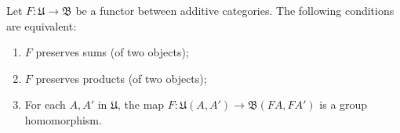 Let $F: \mathfrak{U} \to \mathfrak{B}$ be a functor between additive categories. The following conditions are equivalent:
\begin{enumerate}
\item[(i)] $F$ preserves sums (of two objects);
\item[(ii)] $F$ preserves products (of two objects);
\item[(iii)] For each $A, A'$ in $\mathfrak{U}$, the map $F: \mathfrak{U}(A, A') \to \mathfrak{B}(FA, FA')$ is a group homomorphism.
\end{enumerate}
